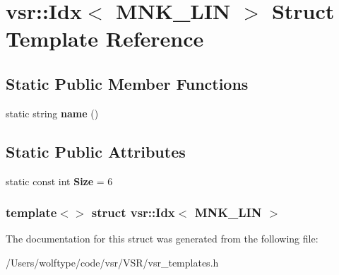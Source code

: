 \hypertarget{structvsr_1_1_idx_3_01_m_n_k___l_i_n_01_4}{\section{vsr\-:\-:Idx$<$ M\-N\-K\-\_\-\-L\-I\-N $>$ Struct Template Reference}
\label{structvsr_1_1_idx_3_01_m_n_k___l_i_n_01_4}
}
\subsection*{Static Public Member Functions}
\begin{DoxyCompactItemize}
\item 
\hypertarget{structvsr_1_1_idx_3_01_m_n_k___l_i_n_01_4_ad53e52449bf9ef278171a3723cebbbc9}{static string {\bfseries name} ()}\label{structvsr_1_1_idx_3_01_m_n_k___l_i_n_01_4_ad53e52449bf9ef278171a3723cebbbc9}

\end{DoxyCompactItemize}
\subsection*{Static Public Attributes}
\begin{DoxyCompactItemize}
\item 
\hypertarget{structvsr_1_1_idx_3_01_m_n_k___l_i_n_01_4_aeebed879562ac45d0deef459965d4c66}{static const int {\bfseries Size} = 6}\label{structvsr_1_1_idx_3_01_m_n_k___l_i_n_01_4_aeebed879562ac45d0deef459965d4c66}

\end{DoxyCompactItemize}
\subsubsection*{template$<$$>$ struct vsr\-::\-Idx$<$ M\-N\-K\-\_\-\-L\-I\-N $>$}



The documentation for this struct was generated from the following file\-:\begin{DoxyCompactItemize}
\item 
/\-Users/wolftype/code/vsr/\-V\-S\-R/vsr\-\_\-templates.\-h\end{DoxyCompactItemize}
